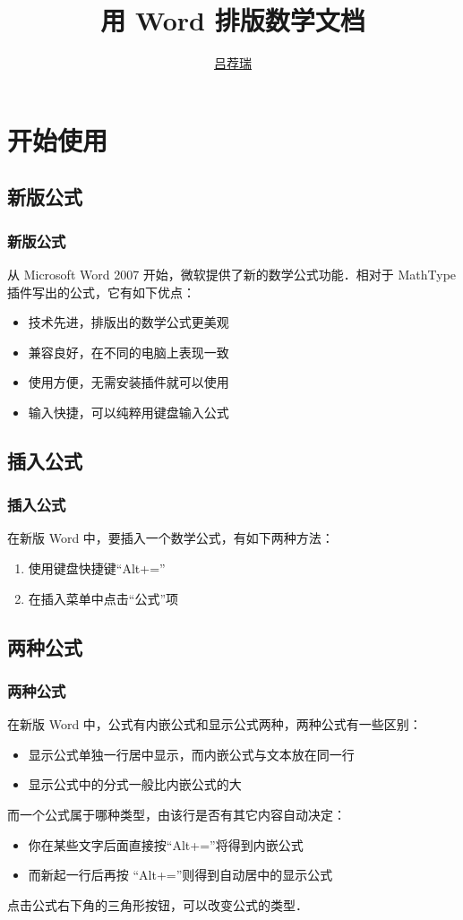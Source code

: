 \documentclass[12pt,notheorems,xcolor={rgb}]{beamer}
\newenvironment{framex}{\begin{frame}[fragile=singleslide,environment=framex]}{\end{frame}}
\def\bold#1{\textcolor{accent2}{#1}}
\begin{document}
\title{用 Word 排版数学文档}
\author{\href{https://lvjr.bitbucket.io}{吕荐瑞}}

\begin{frame}[plain]
\titlepage
\end{frame}

\section{开始使用}

\subsection{新版公式}

\begin{frame}
\frametitle{新版公式}
从 Microsoft Word 2007 开始，微软提供了新的数学公式功能．相对于 MathType 插件写出的公式，它有如下优点：
\begin{itemize}
  \item 技术先进，排版出的数学公式更美观
  \item 兼容良好，在不同的电脑上表现一致
  \item 使用方便，无需安装插件就可以使用
  \item 输入快捷，可以纯粹用键盘输入公式
\end{itemize}
\end{frame}

\subsection{插入公式}

\begin{framex}
\frametitle{插入公式}
在新版 Word 中，要插入一个数学公式，有如下两种方法：
\begin{enumerate}
  \item 使用键盘快捷键“Alt+=”
  \item 在插入菜单中点击“公式”项
\end{enumerate}
\end{framex}

\subsection{两种公式}

\begin{framex}
\frametitle{两种公式}
在新版 Word 中，公式有\bold{内嵌公式}和\bold{显示公式}两种，两种公式有一些区别：
\begin{itemize}
  \item 显示公式单独一行居中显示，而内嵌公式与文本放在同一行
  \item 显示公式中的分式一般比内嵌公式的大
\end{itemize}
而一个公式属于哪种类型，由该行是否有其它内容自动决定：
\begin{itemize}
  \item 你在某些文字后面直接按“Alt+=”将得到内嵌公式
  \item 而新起一行后再按 “Alt+=”则得到自动居中的显示公式
\end{itemize}
点击公式右下角的三角形按钮，可以改变公式的类型．
\end{framex}
\end{document}
